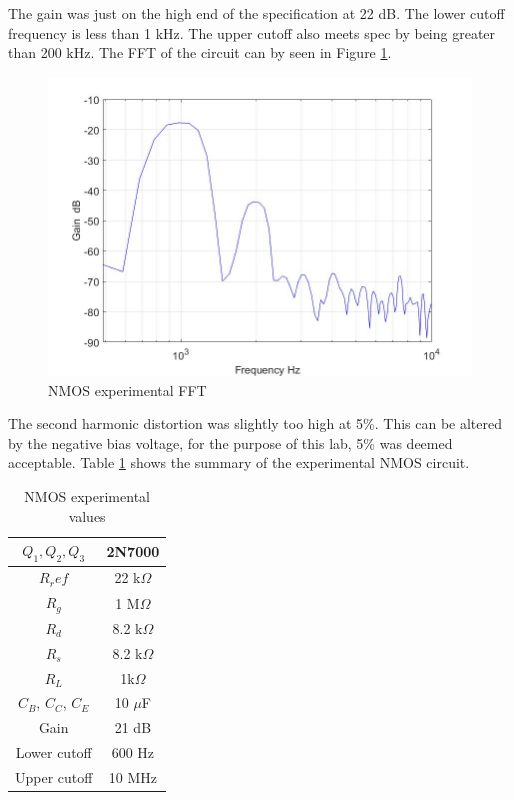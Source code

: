 The gain was just on the high end of the specification at 22 dB. The lower cutoff frequency is less than 1 kHz. The upper cutoff also meets spec by being greater than 200 kHz. The FFT of the circuit can by seen in Figure \ref{fig:nmosexpfft}.

\begin{figure}[H]
	\centering
	\includegraphics[width=0.7\linewidth]{ExperimentalImplementation/nmos_fft.jpg}
	\caption{NMOS experimental FFT}
	\label{fig:nmosexpfft}
\end{figure}

The second harmonic distortion was slightly too high at 5\%. This can be altered by the negative bias voltage, for the purpose of this lab, 5\% was deemed acceptable. Table \ref{tab:nmosexp} shows the summary of the experimental NMOS circuit.


\begin{table}[H]
	\centering
	\caption{NMOS experimental values}
	\label{tab:nmosexp}
	\begin{tabular}{|c|c|}
		$Q_1, Q_2, Q_3$ & 2N7000        \\ \hline
		$R_ref$         & 22 k$\Omega$ \\ \hline
		$R_g$           & 1 M$\Omega$  \\ \hline
		$R_d$           & 8.2 k$\Omega$   \\ \hline
		$R_s$           & 8.2 k$\Omega$  \\ \hline
		$R_L$           & 1k$\Omega$    \\ \hline
		$C_B$, $C_C$, $C_E$ & 10 $\mu$F         \\ \hline   
		Gain            & 21 dB   \\   \hline
		Lower cutoff    & 600 Hz \\ \hline
		Upper cutoff    & 10  MHz \\ \hline
	\end{tabular}
\end{table}

